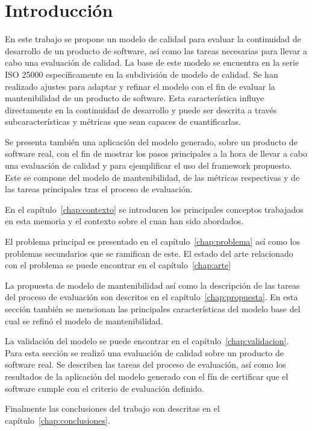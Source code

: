 \chapter{Introducción}
En este trabajo se propone un modelo de calidad para evaluar la continuidad
de desarrollo de un producto de software, así como las tareas necesarias
para llevar a cabo una evaluación de calidad.
La base de este modelo se encuentra en la serie ISO 25000
específicamente en la subdivisión de modelo de calidad.
Se han realizado ajustes para adaptar y refinar el modelo con el fin de evaluar la mantenibilidad de un producto de software.
Esta característica influye directamente en la continuidad de desarrollo y puede
ser descrita a través subcaracterísticas y métricas que sean capaces de cuantificarlas.

Se presenta también una aplicación del modelo generado, sobre un producto de software
real, con el fin de mostrar los pasos principales a la hora de llevar a cabo
una evaluación de calidad y para ejemplificar el uso del framework propuesto. Este se compone
del modelo de mantenibilidad, de las métricas respectivas y de las tareas principales tras el proceso de evaluación.

En el capítulo~\ref{chap:contexto} se introducen los principales conceptos trabajados
en esta memoria y el contexto sobre el cuan han sido abordados.

El problema principal es presentado en el capítulo~\ref{chap:problema} así como
los problemas secundarios que se ramifican de este. El estado del arte relacionado
con el problema se puede encontrar en el capítulo~\ref{chap:arte}

La propuesta de modelo de mantenibilidad así como la descripción de las tareas del proceso
de evaluación son descritos en el capítulo~\ref{chap:propuesta}. En esta sección
también se mencionan las principales características del modelo base del cual
se refinó el modelo de mantenibilidad.

La validación del modelo se puede encontrar en el capítulo~\ref{chap:validacion}.
Para esta sección se realizó una evaluación de calidad sobre un producto de software
real. Se describen las tareas del proceso de evaluación, así como los resultados
de la aplicación del modelo generado con el fín de certificar que el software
cumple con el criterio de evaluación definido.

Finalmente las conclusiones del trabajo son descritas en el capítulo~\ref{chap:conclusiones}.
